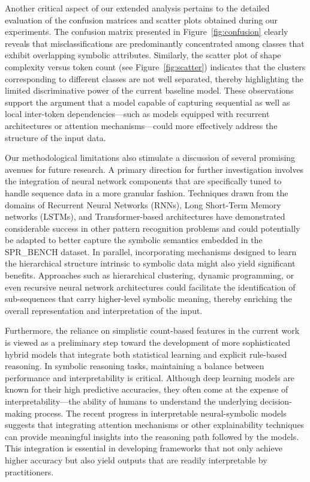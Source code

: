 \documentclass{article}
\begin{document}
Another critical aspect of our extended analysis pertains to the detailed evaluation of the confusion matrices and scatter plots obtained during our experiments. The confusion matrix presented in Figure~\ref{fig:confusion} clearly reveals that misclassifications are predominantly concentrated among classes that exhibit overlapping symbolic attributes. Similarly, the scatter plot of shape complexity versus token count (see Figure~\ref{fig:scatter}) indicates that the clusters corresponding to different classes are not well separated, thereby highlighting the limited discriminative power of the current baseline model. These observations support the argument that a model capable of capturing sequential as well as local inter-token dependencies—such as models equipped with recurrent architectures or attention mechanisms—could more effectively address the structure of the input data. 

Our methodological limitations also stimulate a discussion of several promising avenues for future research. A primary direction for further investigation involves the integration of neural network components that are specifically tuned to handle sequence data in a more granular fashion. Techniques drawn from the domains of Recurrent Neural Networks (RNNs), Long Short-Term Memory networks (LSTMs), and Transformer-based architectures have demonstrated considerable success in other pattern recognition problems and could potentially be adapted to better capture the symbolic semantics embedded in the SPR_BENCH dataset. In parallel, incorporating mechanisms designed to learn the hierarchical structure intrinsic to symbolic data might also yield significant benefits. Approaches such as hierarchical clustering, dynamic programming, or even recursive neural network architectures could facilitate the identification of sub-sequences that carry higher-level symbolic meaning, thereby enriching the overall representation and interpretation of the input.

Furthermore, the reliance on simplistic count-based features in the current work is viewed as a preliminary step toward the development of more sophisticated hybrid models that integrate both statistical learning and explicit rule-based reasoning. In symbolic reasoning tasks, maintaining a balance between performance and interpretability is critical. Although deep learning models are known for their high predictive accuracies, they often come at the expense of interpretability—the ability of humans to understand the underlying decision-making process. The recent progress in interpretable neural-symbolic models suggests that integrating attention mechanisms or other explainability techniques can provide meaningful insights into the reasoning path followed by the models. This integration is essential in developing frameworks that not only achieve higher accuracy but also yield outputs that are readily interpretable by practitioners.
\end{document}
